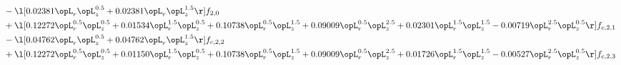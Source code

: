 \begin{alignat}{2}
& - \l[  0.02381 \opL_r \opL_z^{0.5} +  0.02381 \opL_r \opL_z^{1.5}  \r] f_{2,0} \nonumber \\ 
& + \l[  0.12272 \opL_r^{0.5} \opL_z^{0.5} +  0.01534 \opL_r^{1.5} \opL_z^{0.5} +  0.10738 \opL_r^{0.5} \opL_z^{1.5} +  0.09009 \opL_r^{0.5} \opL_z^{2.5} +  0.02301 \opL_r^{1.5} \opL_z^{1.5}   -0.00719 \opL_r^{2.5} \opL_z^{0.5}  \r] f_{c,2,1} \nonumber \\ 
& - \l[  0.04762 \opL_r \opL_z^{0.5} +  0.04762 \opL_r \opL_z^{1.5}  \r] f_{c,2,2} \nonumber \\ 
& + \l[  0.12272 \opL_r^{0.5} \opL_z^{0.5} +  0.01150 \opL_r^{1.5} \opL_z^{0.5} +  0.10738 \opL_r^{0.5} \opL_z^{1.5} +  0.09009 \opL_r^{0.5} \opL_z^{2.5} +  0.01726 \opL_r^{1.5} \opL_z^{1.5}   -0.00527 \opL_r^{2.5} \opL_z^{0.5}  \r] f_{c,2,3} \nonumber \\ 
\end{alignat} 


